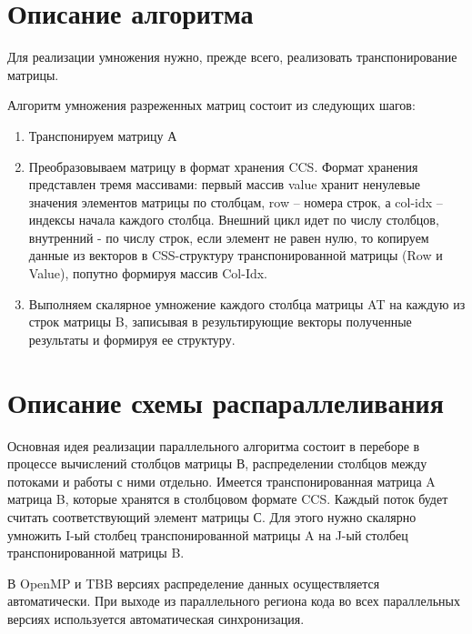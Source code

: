 \documentclass{report}
\begin{document}
\section*{Описание алгоритма}
\par Для реализации умножения нужно, прежде всего, реализовать транспонирование матрицы.
\par Алгоритм умножения разреженных матриц состоит из следующих шагов:
\begin{enumerate}
\item Транспонируем матрицу А
\item Преобразовываем матрицу в формат хранения CCS. Формат хранения представлен тремя массивами: первый  массив value хранит ненулевые значения элементов матрицы по столбцам, row – номера строк, а col-idx – индексы начала каждого столбца. Внешний цикл идет по числу столбцов, внутренний - по числу строк, если элемент не равен нулю, то копируем данные из векторов в CSS-структуру транспонированной матрицы (Row и Value), попутно формируя массив Col-Idx.
\item Выполняем скалярное умножение  каждого столбца матрицы AT на каждую из строк матрицы B, записывая в результирующие векторы  полученные результаты и формируя ее структуру.
 
\end{enumerate}
\newpage

\section*{Описание схемы распараллеливания}
\par Основная идея реализации параллельного  алгоритма состоит в переборе в процессе вычислений столбцов матрицы В, распределении столбцов между потоками и работы с ними отдельно. Имеется транспонированная матрица A матрица B, которые хранятся в столбцовом формате CCS. Каждый поток будет считать соответствующий элемент матрицы С. Для этого нужно скалярно умножить I-ый столбец транспонированной матрицы A на J-ый столбец транспонированной матрицы B. 
\par В OpenMP и TBB версиях распределение данных осуществляется автоматически. При выходе из параллельного региона кода во всех параллельных версиях используется автоматическая синхронизация.

\newpage

\end{document}
